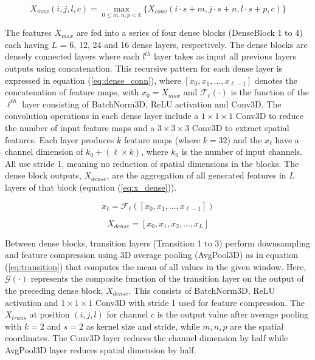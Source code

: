 \documentclass[12pt]{article}
\begin{document}
\begin{equation} \label{eq:maxpool}
X_{max}{(i,j,l,c)} = \max_{0 \leq m, n, p < k} \{ X_{conv}{(i \cdot s + m, j \cdot s + n, l \cdot s + p,c)} \}
\end{equation}

The features $X_{max}$ are fed into a series of four dense blocks (DenseBlock 1 to 4) each having $L$ = 6, 12, 24 and 16 dense layers, respectively. The dense blocks are densely connected layers where each $l^{th}$ layer takes as input all previous layers outputs using concatenation. This recursive pattern for each dense layer is expressed in equation (\ref{eq:dense_conn}), where $[x_0, x_1, \dots, x_{\ell-1}]$ denotes the concatenation of feature maps, with $x_0 = X_{max}$ and $\mathcal{F}_\ell(\cdot)$ is the function of the $\ell^{th}$ layer consisting of BatchNorm3D, ReLU activation and Conv3D. The convolution operations in each dense layer include a $1 \times 1 \times 1$  Conv3D to reduce the number of input feature maps and a $3 \times 3 \times 3$  Conv3D to extract spatial features. Each layer produces $k$ feature maps (where $k=32$) and the $x_\ell$ have a channel dimension of $k_0 + (\ell \times k)$, where $k_0$ is the number of input channels. All use stride 1, meaning no reduction of spatial dimensions in the blocks. The dense block outputs, $X_{dense}$, are the aggregation of all generated features in $L$ layers of that block (equation (\ref{eq:x_dense})).

\begin{equation} \label{eq:dense_conn}
x_\ell = \mathcal{F}_\ell([x_0, x_1, \dots, x_{\ell-1}])
\end{equation}

\begin{equation} \label{eq:x_dense}
X_{dense} = [x_0, x_1, x_2, \dots, x_L]
\end{equation}

Between dense blocks, transition layers (Transition 1 to 3) perform downsampling and feature compression using 3D average pooling (AvgPool3D) as in equation (\ref{eq:transition}) that computes the mean of all values in the given window. Here, $\mathcal{G}(\cdot)$ represents the composite function of the transition layer on the output of the preceding dense block, $X_{dense}$. This consists of BatchNorm3D, ReLU activation and $1 \times 1 \times 1$ Conv3D with stride 1 used for feature compression. The $X_{trans}$ at position $(i, j, l)$ for channel $c$ is the output value after average pooling with $k=2$ and $s=2$ as kernel size and stride, while $m, n, p$ are the spatial coordinates. The Conv3D layer reduces the channel dimension by half while AvgPool3D layer reduces spatial dimension by half.
\end{document}
